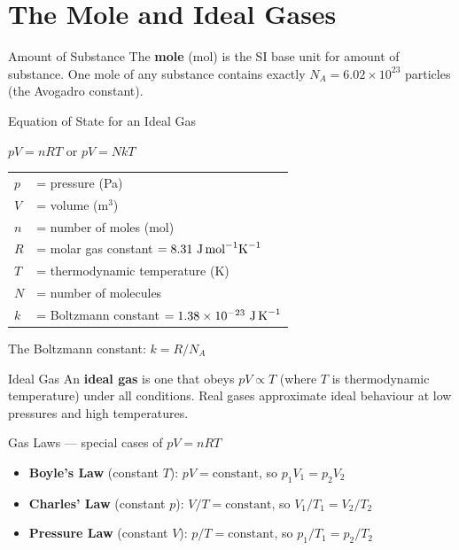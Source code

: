 \section{The Mole and Ideal Gases}

\begin{definitionbox}{Amount of Substance}
The \textbf{mole} (mol) is the SI base unit for amount of substance. One mole of any substance contains exactly $N_A = 6.02 \times 10^{23}$ particles (the Avogadro constant).
\end{definitionbox}

\begin{formulabox}{Equation of State for an Ideal Gas}
\begin{center}
\Large $pV = nRT$ \qquad or \qquad $pV = NkT$
\end{center}
\vspace{0.3em}
\begin{tabular}{@{}ll@{}}
$p$ & = pressure (Pa) \\
$V$ & = volume (m$^3$) \\
$n$ & = number of moles (mol) \\
$R$ & = molar gas constant $= 8.31\ \text{J\,mol}^{-1}\text{K}^{-1}$ \\
$T$ & = thermodynamic temperature (K) \\
$N$ & = number of molecules \\
$k$ & = Boltzmann constant $= 1.38 \times 10^{-23}\ \text{J\,K}^{-1}$ \\
\end{tabular}

\medskip
The Boltzmann constant: $k = R/N_A$
\end{formulabox}

\begin{definitionbox}{Ideal Gas}
An \textbf{ideal gas} is one that obeys $pV \propto T$ (where $T$ is thermodynamic temperature) under all conditions. Real gases approximate ideal behaviour at low pressures and high temperatures.
\end{definitionbox}

\begin{keybox}{Gas Laws --- special cases of \texorpdfstring{$pV = nRT$}{pV = nRT}}
\begin{itemize}[itemsep=4pt]
  \item \textbf{Boyle's Law} (constant $T$): $pV = \text{constant}$, so $p_1V_1 = p_2V_2$
  \item \textbf{Charles' Law} (constant $p$): $V/T = \text{constant}$, so $V_1/T_1 = V_2/T_2$
  \item \textbf{Pressure Law} (constant $V$): $p/T = \text{constant}$, so $p_1/T_1 = p_2/T_2$
\end{itemize}
\end{keybox}

